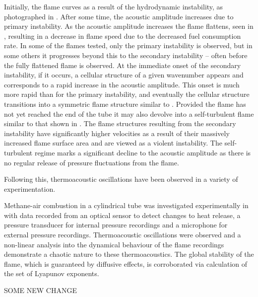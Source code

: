 Initially, the flame curves as a result of the hydrodynamic instability, as photographed in . After some time, the acoustic amplitude increases due to primary instability. As the acoustic amplitude increases the flame flattens, seen in , resulting in a decrease in flame speed due to the decreased fuel consumption rate. In some of the flames tested, only the primary instability is observed, but in some others it progresses beyond this to the secondary instability -- often before the fully flattened flame is observed. At the immediate onset of the secondary instability, if it occurs, a cellular structure of a given wavenumber appears and corresponds to a rapid increase in the acoustic amplitude. This onset is much more rapid than for the primary instability, and eventually the cellular structure transitions into a symmetric flame structure similar to . Provided the flame has not yet reached the end of the tube it may also devolve into a self-turbulent flame similar to that shown in . The flame structures resulting from the secondary instability have significantly higher velocities as a result of their massively increased flame surface area and are viewed as a violent instability. The self-turbulent regime marks a significant decline to the acoustic amplitude as there is no regular release of pressure fluctuations from the flame.


Following this, thermoacoustic oscillations have been observed in a variety of experimentation.

Methane-air combustion in a cylindrical tube was investigated experimentally in \cite{fichera2001ExperimentalAnalysisThermoacoustic} with data recorded from an optical sensor to detect changes to heat release, a pressure transducer for internal pressure recordings and a microphone for external pressure recordings. Thermoacoustic oscillations were observed and a non-linear analysis into the dynamical behaviour of the flame recordings demonstrate a chaotic nature to these thermoacoustics. The global stability of the flame, which is guaranteed by diffusive effects, is corroborated via calculation of the set of Lyapunov exponents.

SOME NEW CHANGE




